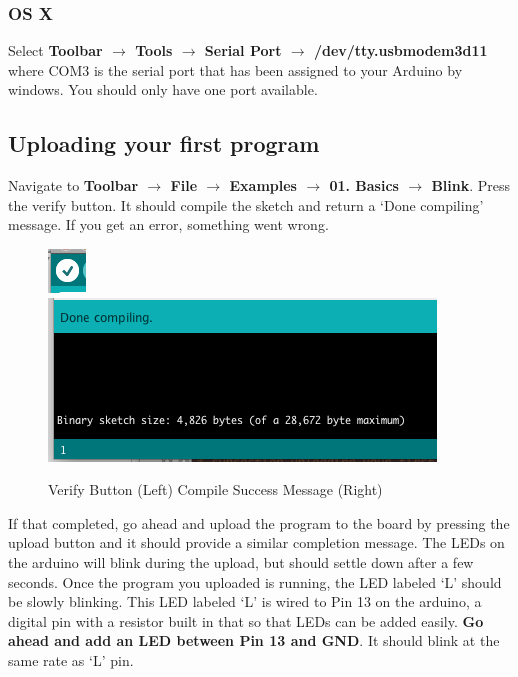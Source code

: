 \documentclass[11pt,a4paper]{article}
\begin{document}

\subsubsection{OS X} %
\label{ssub:os_x}
Select \textbf{Toolbar $\rightarrow$ Tools $\rightarrow$ Serial Port $\rightarrow$ /dev/tty.usbmodem3d11} where COM3 is the serial port that has been assigned to your Arduino by windows.  You should only have one port available.



\subsection{Uploading your first program} %
\label{sub:uploading_your_first_program}
Navigate to \textbf{Toolbar $\rightarrow$ File $\rightarrow$ Examples $\rightarrow$ 01. Basics $\rightarrow$ Blink}.  Press the verify button.  It should compile the sketch and return a `Done compiling' message.  If you get an error, something went wrong.

    \begin{figure}[htbp]
        \centering
            \includegraphics{figures/verify.png}\includegraphics{figures/compile.png}
        \caption{Verify Button (Left) Compile Success Message (Right)}
        \label{fig:figures_verify}
    \end{figure}

    If that completed, go ahead and upload the program to the board by pressing the upload button and it should provide a similar completion message.  The LEDs on the arduino will blink during the upload, but should settle down after a few seconds.  Once the program you uploaded is running, the LED labeled `L' should be slowly blinking.  This LED labeled `L' is wired to Pin 13 on the arduino, a digital pin with a resistor built in that so that LEDs can be added easily.  \textbf{Go ahead and add an LED between Pin 13 and GND}.  It should blink at the same rate as `L' pin.
\end{document}
